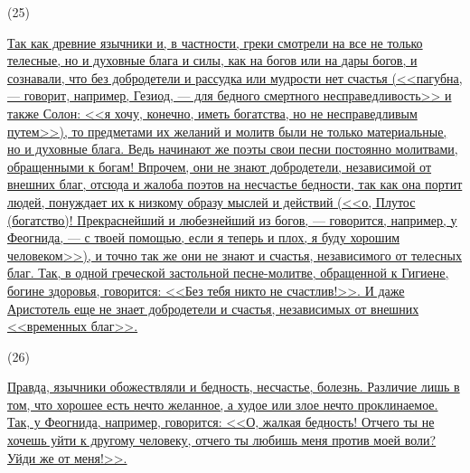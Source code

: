 \documentclass[12pt]{article}
\begin{document}
\hypertarget{25}{(25)} \hyperlink{b25}{Так как древние язычники и, в частности, греки смотрели на все не только телесные, но и духовные блага и силы, как на богов или на дары богов, и сознавали, что без добродетели и рассудка или мудрости нет счастья (<<пагубна, --- говорит, например, Гезиод, --- для бедного смертного несправедливость>>  и также Солон: <<я хочу, конечно, иметь богатства, но не несправедливым путем>>), то предметами их желаний и молитв были не только материальные, но и духовные блага. Ведь начинают же поэты свои песни постоянно молитвами, обращенными к богам! Впрочем, они не знают добродетели, независимой от внешних благ, отсюда и жалоба поэтов на несчастье бедности, так как она портит людей, понуждает их к низкому образу мыслей и действий (<<о, Плутос (богатство)! Прекраснейший и любезнейший из богов, --- говорится, например, у Феогнида, --- с твоей помощью, если я теперь и плох, я буду хорошим человеком>>), и точно так же они не знают и счастья, независимого от телесных благ. Так, в одной греческой застольной песне-молитве, обращенной к Гигиене, богине здоровья, говорится: <<Без тебя никто не счастлив!>>. И даже Аристотель еще не знает добродетели и счастья, независимых от внешних <<временных благ>>.}

\hypertarget{26}{(26)} \hyperlink{b26}{Правда, язычники обожествляли и бедность, несчастье, болезнь. Различие лишь в том, что хорошее есть нечто желанное, а худое или злое нечто проклинаемое. Так, у Феогнида, например, говорится: <<О, жалкая бедность! Отчего ты не хочешь уйти к другому человеку, отчего ты любишь меня против моей воли? Уйди же от меня!>>.}
\end{document}
